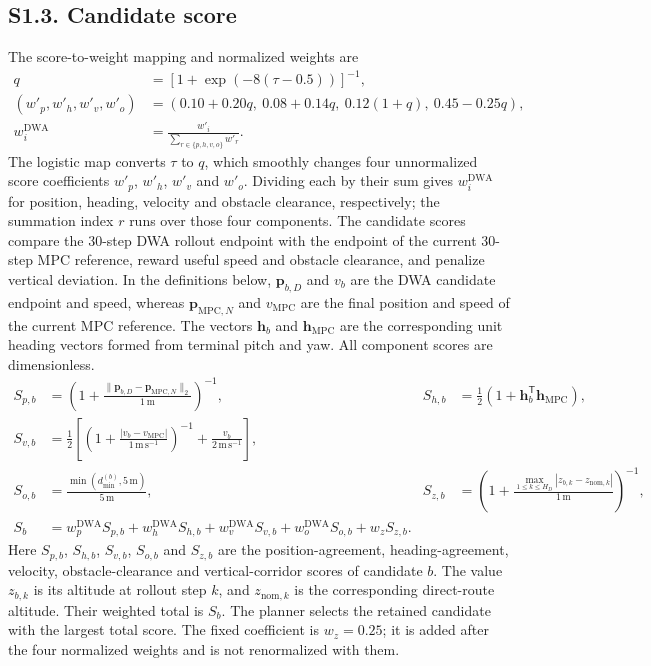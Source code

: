 \documentclass[10pt]{article}
\begin{document}
\subsection*{S1.3. Candidate score}
The score-to-weight mapping and normalized weights are
\begin{equation}
\begin{aligned}
q&=[1+\exp(-8(\tau-0.5))]^{-1},\\
(w'_p,w'_h,w'_v,w'_o)&=(0.10+0.20q,\ 0.08+0.14q,\ 0.12(1+q),\ 0.45-0.25q),\\
w_i^{\mathrm{DWA}}&=\frac{w'_i}{\sum_{r\in\{p,h,v,o\}}w'_r}.
\end{aligned}
\end{equation}
The logistic map converts $\tau$ to $q$, which smoothly changes four unnormalized score coefficients $w'_p$, $w'_h$, $w'_v$ and $w'_o$. Dividing each by their sum gives $w_i^{\mathrm{DWA}}$ for position, heading, velocity and obstacle clearance, respectively; the summation index $r$ runs over those four components.
The candidate scores compare the 30-step DWA rollout endpoint with the endpoint of the current 30-step MPC reference, reward useful speed and obstacle clearance, and penalize vertical deviation. In the definitions below, $\mathbf p_{b,D}$ and $v_b$ are the DWA candidate endpoint and speed, whereas $\mathbf p_{\mathrm{MPC},N}$ and $v_{\mathrm{MPC}}$ are the final position and speed of the current MPC reference. The vectors $\mathbf h_b$ and $\mathbf h_{\mathrm{MPC}}$ are the corresponding unit heading vectors formed from terminal pitch and yaw. All component scores are dimensionless.
\begin{equation}
\begin{aligned}
S_{p,b}&=\left(1+\frac{\|\mathbf p_{b,D}-\mathbf p_{\mathrm{MPC},N}\|_2}{1\,\mathrm m}\right)^{-1}, &
S_{h,b}&=\tfrac12(1+\mathbf h_b^{\mathsf T}\mathbf h_{\mathrm{MPC}}),\\
S_{v,b}&=\tfrac12\left[\left(1+\frac{|v_b-v_{\mathrm{MPC}}|}{1\,\mathrm{m\,s^{-1}}}\right)^{-1}+\frac{v_b}{2\,\mathrm{m\,s^{-1}}}\right],\\
S_{o,b}&=\frac{\min(d_{\min}^{(b)},5\,\mathrm m)}{5\,\mathrm m}, &
S_{z,b}&=\left(1+\frac{\max_{1\leq k\leq H_{\scriptstyle D}}|z_{b,k}-z_{\mathrm{nom},k}|}{1\,\mathrm m}\right)^{-1},\\
S_b&=w_p^{\mathrm{DWA}}S_{p,b}+w_h^{\mathrm{DWA}}S_{h,b}+w_v^{\mathrm{DWA}}S_{v,b}+w_o^{\mathrm{DWA}}S_{o,b}+w_zS_{z,b}.
\end{aligned}
\end{equation}
Here $S_{p,b}$, $S_{h,b}$, $S_{v,b}$, $S_{o,b}$ and $S_{z,b}$ are the position-agreement, heading-agreement, velocity, obstacle-clearance and vertical-corridor scores of candidate $b$. The value $z_{b,k}$ is its altitude at rollout step $k$, and $z_{\mathrm{nom},k}$ is the corresponding direct-route altitude. Their weighted total is $S_b$. The planner selects the retained candidate with the largest total score. The fixed coefficient is $w_z=0.25$; it is added after the four normalized weights and is not renormalized with them.
\end{document}
